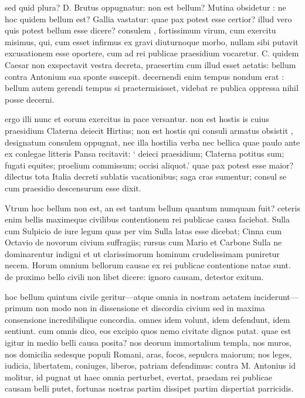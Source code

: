  sed quid plura? D. Brutus oppugnatur: non est bellum? Mutina obsidetur : ne hoc quidem bellum est? Gallia vastatur: quae pax potest esse certior? illud vero quis potest bellum esse dicere? consulem , fortissimum virum, cum exercitu misimus, qui, cum esset infirmus ex gravi diuturnoque morbo, nullam sibi putavit excusationem esse oportere, cum ad rei publicae praesidium vocaretur. C. quidem Caesar non exspectavit vestra decreta, praesertim cum illud esset aetatis: bellum contra Antonium sua sponte suscepit. decernendi enim tempus nondum erat : bellum autem gerendi tempus si praetermisisset, videbat re publica oppressa nihil posse decerni.

 ergo illi nunc et eorum exercitus in pace versantur. non est hostis is cuius praesidium Claterna deiecit Hirtius; non est hostis qui consuli armatus obsistit , designatum consulem oppugnat, nec illa hostilia verba nec bellica quae paulo ante ex conlegae litteris Pansa recitavit: ` deieci praesidium; Claterna potitus sum; fugati equites; proelium commissum; occisi aliquot.' quae pax potest esse maior? dilectus tota Italia decreti sublatis vacationibus; saga cras sumentur; consul se cum praesidio descensurum esse dixit.

 Vtrum hoc bellum non est, an est tantum bellum quantum numquam fuit? ceteris enim bellis maximeque civilibus contentionem rei publicae causa faciebat. Sulla cum Sulpicio de iure legum quas per vim Sulla latas esse dicebat; Cinna cum Octavio de novorum civium suffragiis; rursus cum Mario et Carbone Sulla ne dominarentur indigni et ut clarissimorum hominum crudelissimam puniretur necem. Horum omnium bellorum causae ex rei publicae contentione natae sunt. de proximo bello civili non libet dicere: ignoro causam, detestor exitum.

 hoc bellum quintum civile geritur—atque omnia in nostram aetatem inciderunt—primum non modo non in dissensione et discordia civium sed in maxima consensione incredibilique concordia. omnes idem volunt, idem defendunt, idem sentiunt. cum omnis dico, eos excipio quos nemo civitate dignos putat. quae est igitur in medio belli causa posita? nos deorum immortalium templa, nos muros, nos domicilia sedesque populi Romani, aras, focos, sepulcra maiorum; nos leges, iudicia, libertatem, coniuges, liberos, patriam defendimus: contra M. Antonius id molitur, id pugnat ut haec omnia perturbet, evertat, praedam rei publicae causam belli putet, fortunas nostras partim dissipet partim dispertiat parricidis.

